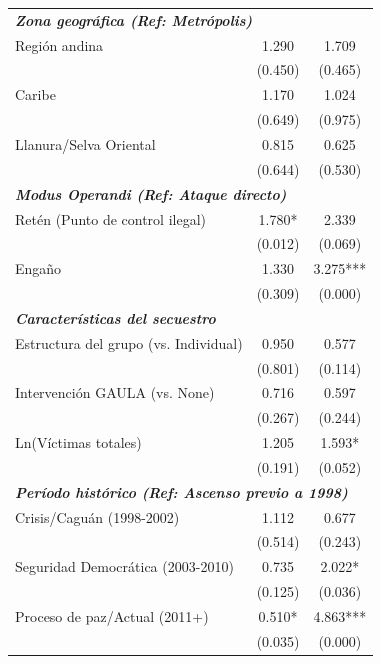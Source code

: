 \documentclass[12pt]{article}
\theoremstyle{definition}
\theoremstyle{remark}
\newcommand{\1}{\mathbf{1}}
\begin{document}
{\begin{ThreePartTable}
\begin{longtable}{lcc}
        \multicolumn{3}{l}{\textbf{\textit{Zona geográfica (Ref: Metrópolis)}}} \\
        Región andina & 1.290 & 1.709 \\
                      & {\scriptsize (0.450)} & {\scriptsize (0.465)} \\
        Caribe & 1.170 & 1.024 \\
                  & {\scriptsize (0.649)} & {\scriptsize (0.975)} \\
        Llanura/Selva Oriental & 0.815 & 0.625 \\
                              & {\scriptsize (0.644)} & {\scriptsize (0.530)} \\
        \midrule
        
        \multicolumn{3}{l}{\textbf{\textit{Modus Operandi (Ref: Ataque directo)}}} \\
        Retén (Punto de control ilegal) & 1.780* & 2.339 \\
                                       & {\scriptsize (0.012)} & {\scriptsize (0.069)} \\
        Engaño & 1.330 & 3.275*** \\
                  & {\scriptsize (0.309)} & {\scriptsize (0.000)} \\
        \midrule
        
        \multicolumn{3}{l}{\textbf{\textit{Características del secuestro}}} \\
        Estructura del grupo (vs. Individual) & 0.950 & 0.577 \\
                                         & {\scriptsize (0.801)} & {\scriptsize (0.114)} \\
        Intervención GAULA (vs. None) & 0.716 & 0.597 \\
                                      & {\scriptsize (0.267)} & {\scriptsize (0.244)} \\
        Ln(Víctimas totales) & 1.205 & 1.593* \\
                          & {\scriptsize (0.191)} & {\scriptsize (0.052)} \\
        \midrule
        
        \multicolumn{3}{l}{\textbf{\textit{Período histórico (Ref: Ascenso previo a 1998)}}} \\
        Crisis/Caguán (1998-2002) & 1.112 & 0.677 \\
                                  & {\scriptsize (0.514)} & {\scriptsize (0.243)} \\
        Seguridad Democrática (2003-2010) & 0.735 & 2.022* \\
                                        & {\scriptsize (0.125)} & {\scriptsize (0.036)} \\
        Proceso de paz/Actual (2011+) & 0.510* & 4.863*** \\
                                               & {\scriptsize (0.035)} & {\scriptsize (0.000)} \\
        \midrule
        

\end{longtable}
\end{ThreePartTable}}
\end{document}
